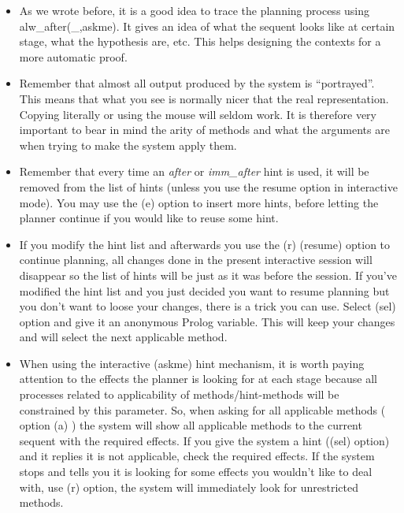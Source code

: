 \begin{itemize}

\item As we wrote before, it is a good idea to trace the planning
process using alw\_after(\_,askme). It gives an idea of what the sequent
looks like at certain stage, what the hypothesis are, etc. This helps
designing the contexts for a more automatic proof.

\item Remember that almost all output produced by the system is
``portrayed''. This means that what you see is normally nicer that the
real representation. Copying literally or using the mouse will seldom
work. It is therefore very important to bear in mind the arity of methods
and what the arguments are when trying to make the system apply them.

\item Remember that every time an {\em after} or {\em imm\_after} hint
is used, it will be removed from the list of hints (unless you use the
resume option in interactive mode). You may use the (e) option to
insert more hints, before letting the planner continue if you would
like to reuse some hint.

\item If you modify the hint list and afterwards you use the (r)
(resume) option to continue planning, all changes done in the present
interactive session will disappear so the list of hints will be just as
it was before the session. If you've modified the hint list and you
just decided you want to resume planning but you don't want to loose
your changes, there is a trick you can use. Select (sel) option and
give it an anonymous Prolog variable. This will keep your changes and
will select the next applicable method.

\item When using the interactive (askme) hint mechanism, it is worth
paying attention to the effects the planner is looking for at each
stage because all processes related to applicability of
methods/hint-methods will be constrained by this parameter. So, when
asking for all applicable methods ( option (a) ) the system will show
all applicable methods to the current sequent with the required
effects. If you give the system a hint ((sel) option) and it replies it
is not applicable, check the required effects. If the system stops and
tells you it is looking for some effects you wouldn't like to deal
with, use (r) option, the system will immediately look for unrestricted
methods.

\end{itemize}











